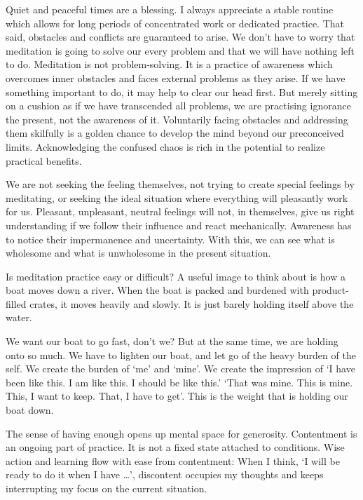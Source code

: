 Quiet and peaceful times are a blessing. I always appreciate a stable
routine which allows for long periods of concentrated work or dedicated
practice. That said, obstacles and conflicts are guaranteed to arise. We
don't have to worry that meditation is going to solve our every problem
and that we will have nothing left to do. Meditation is not
problem-solving. It is a practice of awareness which overcomes inner
obstacles and faces external problems as they arise. If we have
something important to do, it may help to clear our head first. But
merely sitting on a cushion as if we have transcended all problems, we
are practising ignorance the present, not the awareness of it.
Voluntarily facing obstacles and addressing them skilfully is a golden
chance to develop the mind beyond our preconceived limits. Acknowledging
the confused chaos is rich in the potential to realize practical
benefits.

We are not seeking the feeling themselves, not trying to create special
feelings by meditating, or seeking the ideal situation where everything
will pleasantly work for us. Pleasant, unpleasant, neutral feelings will
not, in themselves, give us right understanding if we follow their
influence and react mechanically. Awareness has to notice their
impermanence and uncertainty. With this, we can see what is wholesome
and what is unwholesome in the present situation.


Is meditation practice easy or difficult? A useful image to think about
is how a boat moves down a river. When the boat is packed and burdened
with product-filled crates, it moves heavily and slowly. It is just
barely holding itself above the water.

We want our boat to go fast, don't we? But at the same time, we are
holding onto so much. We have to lighten our boat, and let go of the
heavy burden of the self. We create the burden of `me' and `mine'. We
create the impression of `I have been like this. I am like this. I
should be like this.' `That was mine. This is mine. This, I want to
keep. That, I have to get'. This is the weight that is holding our boat
down.

The sense of having enough opens up mental space for generosity.
Contentment is an ongoing part of practice. It is not a fixed state
attached to conditions. Wise action and learning flow with ease from
contentment: When I think, `I will be ready to do it when I have
\ldots{}', discontent occupies my thoughts and keeps interrupting my
focus on the current situation.

